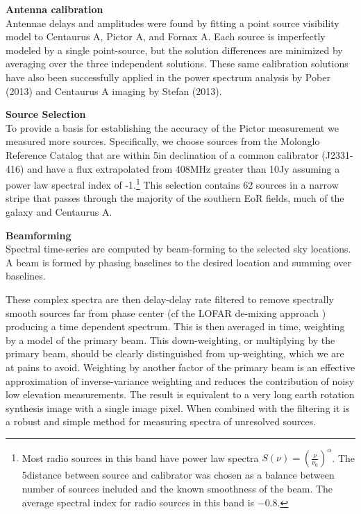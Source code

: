 \documentclass[preprint]{aastex}
\begin{document}
\textbf{Antenna calibration}\\

Antennae delays and amplitudes were found by fitting a point source visibility
model to Centaurus A, Pictor A, and Fornax A.  Each source is imperfectly
modeled by a single point-source, but the solution differences are minimized by
averaging over the three independent solutions. These same calibration
solutions have also been successfully applied in the power spectrum analysis by
Pober (2013) and Centaurus A imaging by Stefan (2013).  

\textbf{Source Selection}\\

To provide a basis for establishing the accuracy of the Pictor measurement we
measured more sources.  Specifically, we choose sources from the Molonglo
Reference Catalog \cite[MRC]{Large:1981p7798} that are within 5\arcdeg in
declination of a common calibrator (J2331-416) and have a flux extrapolated
from 408MHz greater than 10Jy assuming a power law spectral index of
-1.\footnote{Most radio sources in this band have power law spectra $S(\nu) =
\left(\frac{\nu}{\nu_0}\right)^\alpha$.  The 5\arcdeg distance between source
and calibrator was chosen as a balance between number of sources included and
the known smoothness of the beam.   The average spectral index for radio
sources in this band is $-0.8$.} This selection contains 62 sources in a narrow
stripe that passes through the majority of the southern EoR fields, much of the
galaxy and Centaurus A.



\textbf{Beamforming}\\

Spectral time-series are computed by beam-forming to the selected sky
locations. A beam is formed by phasing baselines to the desired location and
summing over baselines.  

 These complex spectra are then delay-delay rate filtered to remove spectrally
smooth sources far from phase center \citep{Parsons:2009p7859} (cf the LOFAR
de-mixing approach \cite{Offringa:2012p9691})  producing a time dependent
spectrum. This is then averaged in time,  weighting by a model of the primary
beam. This down-weighting, or multiplying by the primary beam, should be
clearly distinguished from up-weighting, which we are at pains to avoid.
Weighting by another factor of the primary beam is an effective approximation
of inverse-variance weighting \citep{Pober:2012p8800} and reduces the
contribution of noisy low elevation measurements.  The result is equivalent to
a very long earth rotation synthesis image with a single image pixel. When
combined with the filtering it is a robust and simple method for measuring
spectra of unresolved sources. 
\end{document}
